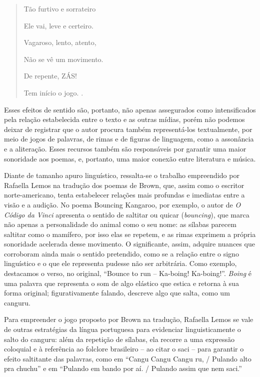 \documentclass[portuguese]{textolivre}
\begin{document}
\begin{quote}
Tão furtivo e sorrateiro
    
Ele vai, leve e certeiro.

Vagaroso, lento, atento,

Não se vê um movimento.

De repente, ZÁS!

Tem início o jogo. \cite[s/p, destaque do autor]{brown_sinfonia_2020}.
\end{quote}

Esses efeitos de sentido são, portanto, não apenas assegurados como
intensificados pela relação estabelecida entre o texto e as outras mídias,
porém não podemos deixar de registrar que o autor procura também representá-los
textualmente, por meio de jogos de palavras, de rimas e de figuras de
linguagem, como a assonância e a aliteração. Esses recursos também são
responsáveis por garantir uma maior sonoridade aos poemas, e, portanto, uma
maior conexão entre literatura e música.

Diante de tamanho apuro linguístico, ressalta-se o trabalho empreendido por
Rafaella Lemos na tradução dos poemas de Brown, que, assim como o escritor
norte-americano, tenta estabelecer relações mais profundas e imediatas entre a
visão e a audição. No poema Bouncing Kangaroo, por exemplo, o autor de
\textit{O Código da Vinci} apresenta o sentido de saltitar ou quicar
(\textit{bouncing}), que marca não apenas a personalidade do animal como o seu
nome: as sílabas parecem saltitar como o mamífero, por isso elas se repetem, e
as rimas exprimem a própria sonoridade acelerada desse movimento. O
significante, assim, adquire nuances que corroboram ainda mais o sentido
pretendido, como se a relação entre o signo linguístico e o que ele representa
pudesse não ser arbitrária. Como exemplo, destacamos o verso, no original,
“Bounce to run – Ka-boing! Ka-boing!”. \textit{Boing} é uma palavra que
representa o som de algo elástico que estica e retorna à sua forma original;
figurativamente falando, descreve algo que salta, como um canguru. 

Para empreender o jogo proposto por Brown na tradução, Rafaella Lemos se vale
de outras estratégias da língua portuguesa para evidenciar linguisticamente o
salto do canguru: além da repetição de sílabas, ela recorre a uma expressão
coloquial e à referência ao folclore brasileiro – ao citar o saci – para
garantir o efeito saltitante das palavras, como em “Cangu Cangu Cangu ru, /
Pulando alto pra chuchu” e em “Pulando em bando por aí. / Pulando assim que nem
saci.”
\end{document}

